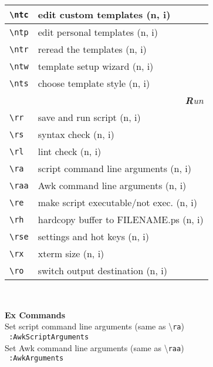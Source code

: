 \documentclass[oneside,10pt,landscape,DIV16]{scrartcl}
\begin{document}
\begin{multicols}{3}
\begin{center}
\begin{tabular}[]{|p{11mm}|p{62mm}|}
\hline     \verb'\ntc' & edit custom templates     \hfill (n, i)\\
\hline     \verb'\ntp' & edit personal templates   \hfill (n, i)\\
\hline     \verb'\ntr' & reread the templates      \hfill (n, i)\\
\hline     \verb'\ntw' & template setup wizard     \hfill (n, i)\\
\hline     \verb'\nts' & choose template style     \hfill (n, i)\\
\hline
\hline
\multicolumn{2}{|r|}{\textsl{\textbf{R}un}} \\[1.0ex]
\hline \verb'\rr '  & save and run script                 \hfill (n, i)   \\
\hline \verb'\rs '  & syntax check                        \hfill (n, i)   \\
\hline \verb'\rl '  & lint check                          \hfill (n, i)   \\
\hline \verb'\ra '  & script command line arguments       \hfill (n, i)   \\
\hline \verb'\raa'  & Awk command line arguments          \hfill (n, i)   \\
\hline \verb'\re'   & make script executable/not exec.    \hfill (n, i)   \\
\hline \verb'\rh '  & hardcopy buffer to FILENAME.ps      \hfill (n, i)   \\
\hline \verb'\rse'  & settings and hot keys               \hfill (n, i)   \\
\hline \verb'\rx '  & xterm size                          \hfill (n, i)   \\
\hline \verb'\ro '  & switch output destination           \hfill (n, i)   \\
\hline
\end{tabular}\\
%
\begin{flushleft}
\large{\textbf{Ex Commands}}\\[1.0ex]
%
Set script command line arguments (same as \textbackslash\texttt{ra})\\[1.0ex]
\texttt{ :AwkScriptArguments}\\[1.0ex]
%
Set Awk command line arguments (same as \textbackslash\texttt{raa})\\[1.0ex]
\texttt{ :AwkArguments}\\[1.0ex]
\end{flushleft}
%
\end{center}%
\end{multicols}%
%
\end{document}

